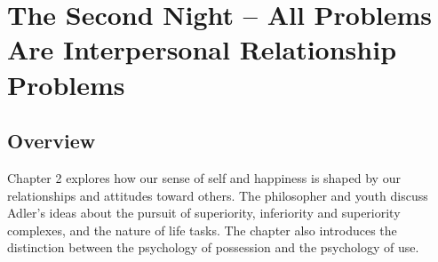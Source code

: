 \section{The Second Night – All Problems Are Interpersonal Relationship Problems}

\subsection*{Overview}
Chapter 2 explores how our sense of self and happiness is shaped by our relationships and attitudes toward others. The philosopher and youth discuss Adler’s ideas about the pursuit of superiority, inferiority and superiority complexes, and the nature of life tasks. The chapter also introduces the distinction between the psychology of possession and the psychology of use.

